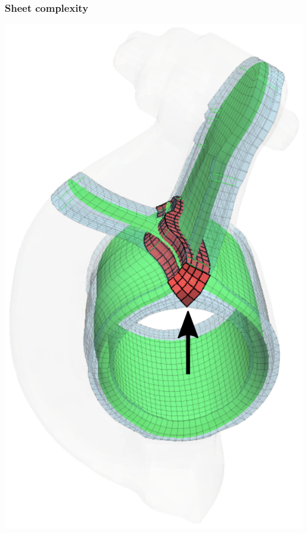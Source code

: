 \documentclass[12pt]{beamer}
\begin{document}
\begin{frame}
  \frametitle{Sheet complexity}
  \begin{center}
    \includegraphics[height=0.8\textheight]{./images/self-intersect.png}
  \end{center}
\end{frame}
\end{document}
